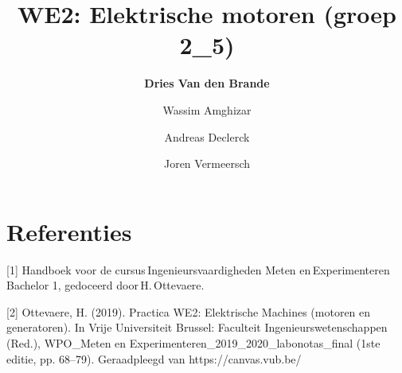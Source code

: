 \documentclass[12pt]{article}
\title{WE2: Elektrische motoren (groep 2\_5)}
\author{\textbf{Dries Van den Brande} \and Wassim Amghizar 
\and Andreas Declerck \and Joren Vermeersch}
\begin{document}
\maketitle















\section{Referenties}

[1] Handboek voor de cursus Ingenieursvaardigheden Meten en Experimenteren Bachelor 1, gedoceerd door H. Ottevaere.

[2] Ottevaere, H. (2019). Practica WE2: Elektrische Machines (motoren en generatoren). In Vrije Universiteit Brussel: Faculteit Ingenieurswetenschappen (Red.), WPO_Meten en Experimenteren_2019_2020_labonotas_final (1ste editie, pp. 68–79). Geraadpleegd van https://canvas.vub.be/
\end{document}
